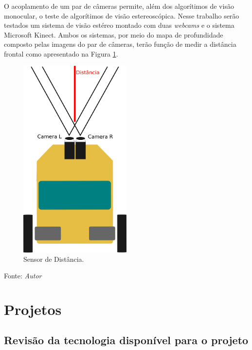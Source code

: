 O acoplamento de um par de câmeras permite, além dos algorítimos de visão monocular, o teste de algorítimos de visão estereoscópica.
Nesse trabalho serão testados um sistema de visão estéreo montado com duas \textit{webcams} e o sistema Microsoft Kinect. 
Ambos os sistemas, por meio do mapa de profundidade composto pelas imagens do par de câmeras, terão função de medir a distância frontal como apresentado na Figura \ref{fig:visao_estereo}.

\begin{figure}[!htb]
  \centering
  \caption{Sensor de Distância.}
  \label{fig:visao_estereo}
  \includegraphics[width=0.5\textwidth]{./img/concepcao/visao_estereo.png}
\end{figure}
Fonte: \textit{Autor}

\pagebreak

\chapter{Projetos}

\section{Revisão da tecnologia disponível para o projeto}

